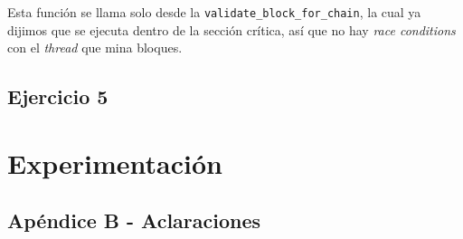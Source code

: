 \documentclass[10pt, a4paper, hidelinks]{article}
\begin{document}
Esta función se llama solo desde la \texttt{validate\_block\_for\_chain}, la cual ya dijimos que se ejecuta dentro de la sección crítica, así que no hay \textit{race conditions} con el \textit{thread} que mina bloques.

\subsection{Ejercicio 5}

\section{Experimentación}


\newpage



\subsection{Apéndice B - Aclaraciones}
\end{document}
